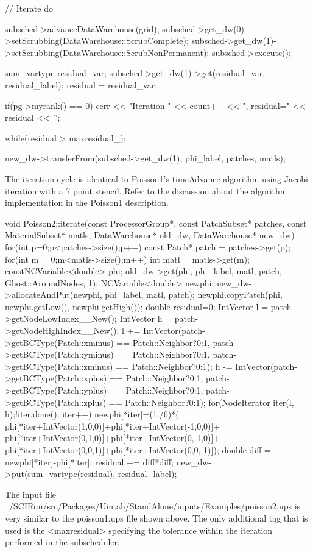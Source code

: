 \documentclass[12pt]{report}
\begin{document}
{  // Iterate
  do {
    subsched->advanceDataWarehouse(grid);
    subsched->get_dw(0)->setScrubbing(DataWarehouse::ScrubComplete);
    subsched->get_dw(1)->setScrubbing(DataWarehouse::ScrubNonPermanent);
    subsched->execute();    

    sum_vartype residual_var;
    subsched->get_dw(1)->get(residual_var, residual_label);
    residual = residual_var;

    if(pg->myrank() == 0)
      cerr << "Iteration " << count++ << ", residual=" << residual << '\n';
  } while(residual > maxresidual_);

  new_dw->transferFrom(subsched->get_dw(1), phi_label, patches, matls);
}

The iteration cycle is identical to Poisson1's timeAdvance algorithm using Jacobi iteration with a 7 point stencil.  Refer to the discussion about the algorithm implementation in the Poisson1 description.

void Poisson2::iterate(const ProcessorGroup*,
		    const PatchSubset* patches,
		    const MaterialSubset* matls,
		    DataWarehouse* old_dw, DataWarehouse* new_dw)
{
  for(int p=0;p<patches->size();p++){
    const Patch* patch = patches->get(p);
    for(int m = 0;m<matls->size();m++){
      int matl = matls->get(m);
      constNCVariable<double> phi;
      old_dw->get(phi, phi_label, matl, patch, Ghost::AroundNodes, 1);
      NCVariable<double> newphi;
      new_dw->allocateAndPut(newphi, phi_label, matl, patch);
      newphi.copyPatch(phi, newphi.getLow(), newphi.getHigh());
      double residual=0;
      IntVector l = patch->getNodeLowIndex__New();
      IntVector h = patch->getNodeHighIndex__New(); 
      l += IntVector(patch->getBCType(Patch::xminus) == Patch::Neighbor?0:1,
		  patch->getBCType(Patch::yminus) == Patch::Neighbor?0:1,
		  patch->getBCType(Patch::zminus) == Patch::Neighbor?0:1);
      h -= IntVector(patch->getBCType(Patch::xplus) == Patch::Neighbor?0:1,
		  patch->getBCType(Patch::yplus) == Patch::Neighbor?0:1,
		  patch->getBCType(Patch::zplus) == Patch::Neighbor?0:1);
      for(NodeIterator iter(l, h);!iter.done(); iter++){
	newphi[*iter]=(1./6)*(
	phi[*iter+IntVector(1,0,0)]+phi[*iter+IntVector(-1,0,0)]+
	phi[*iter+IntVector(0,1,0)]+phi[*iter+IntVector(0,-1,0)]+
	phi[*iter+IntVector(0,0,1)]+phi[*iter+IntVector(0,0,-1)]);
	double diff = newphi[*iter]-phi[*iter];
	residual += diff*diff;
      }
      new_dw->put(sum_vartype(residual), residual_label);
    }
  }
}

The input file ~/SCIRun/src/Packages/Uintah/StandAlone/inputs/Examples/poisson2.ups is very similar to the poisson1.ups file shown above.  The only additional tag that is used is the <maxresidual> specifying the tolerance within the iteration performed in the subscheduler.
\end{document}
